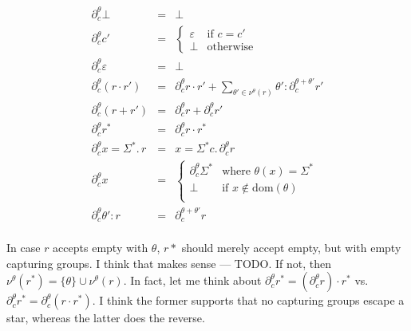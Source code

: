 \documentclass[11pt]{amsart}
\begin{document}
$$
\begin{array}{rcl}
\partial_c^\theta \bot &=& \bot \\
\partial_c^\theta c' &=&
	\begin{cases}
	\varepsilon & \textrm{if } c = c' \\
	\bot & \textrm{otherwise}
	\end{cases} \\
\partial_c^\theta \varepsilon &=& \bot \\
\partial_c^\theta (r\cdot r') &=&
	\partial_c^\theta r\cdot r' +
	\sum_{\theta' \in \nu^\theta(r)} \theta'{: \partial_c^{\theta+\theta'} r'} \\
\partial_c^\theta (r + r') &=& \partial_c^\theta r + \partial_c^\theta r' \\
\partial_c^\theta r^* &=& \partial_c^\theta r\cdot r^* \\
\partial_c^\theta x{=}\Sigma^*.\,r &=& x{=}\Sigma^*c.\,\partial_c^\theta r \\
\partial_c^\theta x &=&
	\begin{cases}
	\partial_c^\theta \Sigma^* & \textrm{where }\theta(x)=\Sigma^* \\
	\bot & \textrm{if } x \notin \mathrm{dom}(\theta) \\
	\end{cases} \\
\partial_c^\theta \theta'{: r} &=& \partial_c^{\theta + \theta'}r \\
\end{array}
$$


In case $r$ accepts empty with $\theta$, $r*$ should merely accept empty, but with empty capturing groups.
I think that makes sense --- TODO.
If not, then $\nu^\theta(r^*) = \{\theta\} \cup \nu^\theta(r)$.
In fact, let me think about $\partial_c^\theta r^* = (\partial_c^\theta r)\cdot r^*$ vs. $\partial_c^\theta r^* = \partial_c^\theta (r\cdot r^*)$.
I think the former supports that no capturing groups escape a star, whereas the latter does the reverse.
\end{document}
